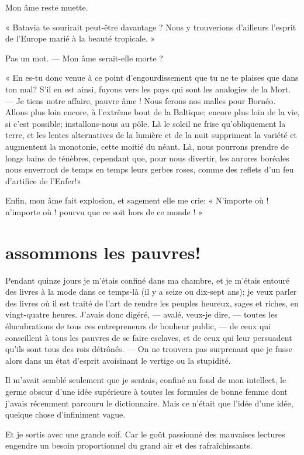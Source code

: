 Mon âme reste muette.

« Batavia te sourirait peut{}-être davantage ? Nous y trouverions
d’ailleurs l’esprit de
l’Europe marié à la beauté tropicale. »

Pas un mot. --- Mon âme serait{}-elle morte ?

« En es{}-tu donc venue à ce point d’engourdissement
que tu ne te plaises que dans ton mal? S’il en est
ainsi, fuyons vers les pays qui sont les analogies de la Mort. --- Je
tiens notre affaire, pauvre âme ! Nous ferons nos malles pour Bornéo.
Allons plus loin encore, à l’extrême bout de la
Baltique; encore plus loin de la vie, si c’est
possible; installons{}-nous au pôle. Là le soleil ne frise
qu’obliquement la terre, et les lentes alternatives de
la lumière et de la nuit suppriment la variété et augmentent la
monotonie, cette moitié du néant. Là, nous pourrons prendre de longs
bains de ténèbres, cependant que, pour nous divertir, les aurores
boréales nous enverront de temps en temps leurs gerbes roses, comme des
reflets d’un feu d’artifice de
l’Enfer!»

Enfin, mon âme fait explosion, et sagement elle me crie: «
N’importe où ! n’importe où ! pourvu
que ce soit hors de ce monde ! »

\quebra\section[Assommons les pauvres!]{assommons les pauvres!}

Pendant quinze jours je m’étais confiné dans ma
chambre, et je m’étais entouré des livres à la mode
dans ce temps{}-là (il y a seize ou dix{}-sept ans); je veux parler des
livres où il est traité de l’art de rendre les peuples
heureux, sages et riches, en vingt{}-quatre heures.
J’avais donc digéré, --- avalé, veux{}-je dire, --- toutes
les élucubrations de tous ces entrepreneurs de bonheur public, --- de
ceux qui conseillent à tous les pauvres de se faire esclaves, et de
ceux qui leur persuadent qu’ils sont tous des rois
détrônés. --- On ne trouvera pas surprenant que je fusse alors dans un
état d’esprit avoisinant le vertige ou la stupidité.

Il m’avait semblé seulement que je sentais, confiné au
fond de mon intellect, le germe obscur d’une idée
supérieure à toutes les formules de bonne femme dont
j’avais récemment parcouru le dictionnaire. Mais ce
n’était que l’idée
d’une idée, quelque chose
d’infiniment vague.

Et je sortis avec une grande soif. Car le goût passionné des mauvaises
lectures engendre un besoin proportionnel du grand air et des
rafraîchissants.

